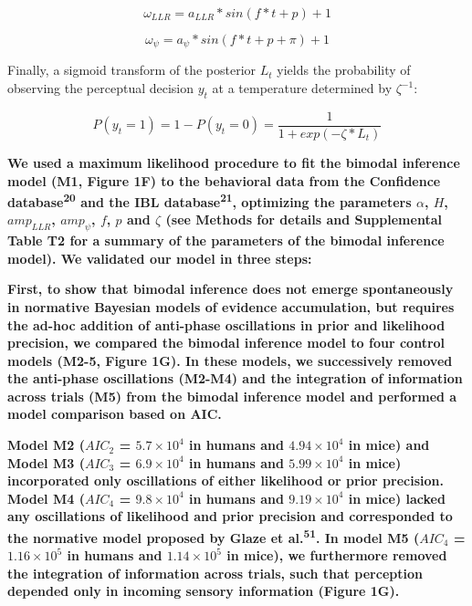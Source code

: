 \documentclass[
]{article}
\begin{document}
\begin{equation}
\omega_{LLR} = a_{LLR} * sin(f * t + p) + 1
\end{equation}

\begin{equation}
\omega_{\psi} = a_{\psi} * sin(f * t + p + \pi) + 1
\end{equation}

Finally, a sigmoid transform of the posterior \(L_t\) yields the
probability of observing the perceptual decision \(y_t\) at a
temperature determined by \(\zeta^{-1}\):

\begin{equation}
P(y_t = 1) = 1 - P(y_t = 0) = \frac{1}{1 + exp(-\zeta * L_t)}
\end{equation}

\textbf{We used a maximum likelihood procedure to fit the bimodal
inference model (M1, Figure 1F) to the behavioral data from the
Confidence database\textsuperscript{20} and the IBL
database\textsuperscript{21}, optimizing the parameters \(\alpha\),
\(H\), \(amp_{LLR}\), \(amp_{\psi}\), \(f\), \(p\) and \(\zeta\) (see
Methods for details and Supplemental Table T2 for a summary of the
parameters of the bimodal inference model). We validated our model in
three steps:}

\textbf{First, to show that bimodal inference does not emerge
spontaneously in normative Bayesian models of evidence accumulation, but
requires the ad-hoc addition of anti-phase oscillations in prior and
likelihood precision, we compared the bimodal inference model to four
control models (M2-5, Figure 1G). In these models, we successively
removed the anti-phase oscillations (M2-M4) and the integration of
information across trials (M5) from the bimodal inference model and
performed a model comparison based on AIC.}

\textbf{Model M2 (\(AIC_2\) = \(\ensuremath{5.7\times 10^{4}}\) in
humans and \(\ensuremath{4.94\times 10^{4}}\) in mice) and Model M3
(\(AIC_3\) = \(\ensuremath{6.9\times 10^{4}}\) in humans and
\(\ensuremath{5.99\times 10^{4}}\) in mice) incorporated only
oscillations of either likelihood or prior precision. Model M4
(\(AIC_4\) = \(\ensuremath{9.8\times 10^{4}}\) in humans and
\(\ensuremath{9.19\times 10^{4}}\) in mice) lacked any oscillations of
likelihood and prior precision and corresponded to the normative model
proposed by Glaze et al.\textsuperscript{51}. In model M5 (\(AIC_4\) =
\(\ensuremath{1.16\times 10^{5}}\) in humans and
\(\ensuremath{1.14\times 10^{5}}\) in mice), we furthermore removed the
integration of information across trials, such that perception depended
only in incoming sensory information (Figure 1G).}
\end{document}
